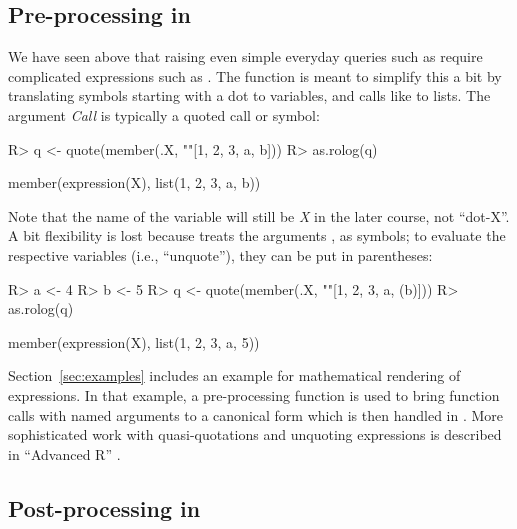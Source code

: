 \documentclass[article]{jss}
\begin{document}
\subsection[Pre-processing in R]{Pre-processing in }

We have seen above that raising even simple everyday  queries
such as  require 
complicated  expressions such as
.
The  function  is meant to simplify this a bit
by translating symbols starting with a dot to  variables, and 
calls like  to lists. The argument \emph{Call} is 
typically a quoted  call or symbol:

\begin{Schunk}
\begin{Sinput}
R> q <- quote(member(.X, ""[1, 2, 3, a, b]))
R> as.rolog(q)
\end{Sinput}
\begin{Soutput}
member(expression(X), list(1, 2, 3, a, b))
\end{Soutput}
\end{Schunk}

Note that the name of the variable will still be \emph{X} in the later course, 
not ``dot-X''. A bit flexibility is lost because  treats the
arguments ,  as symbols; to evaluate the respective 
variables (i.e., ``unquote''), they can be put in parentheses:

\begin{Schunk}
\begin{Sinput}
R> a <- 4
R> b <- 5
R> q <- quote(member(.X, ""[1, 2, 3, a, (b)]))
R> as.rolog(q)
\end{Sinput}
\begin{Soutput}
member(expression(X), list(1, 2, 3, a, 5))
\end{Soutput}
\end{Schunk}

Section~\ref{sec:examples} includes an example for mathematical rendering 
of  expressions. In that example, a pre-processing function is used
to bring function calls with named arguments to a canonical form which is then
handled in . More sophisticated work with quasi-quotations and
unquoting expressions is described in ``Advanced R'' \citep{Wickham2019}.

\subsection[Post-processing in R]{Post-processing in }
\end{document}
